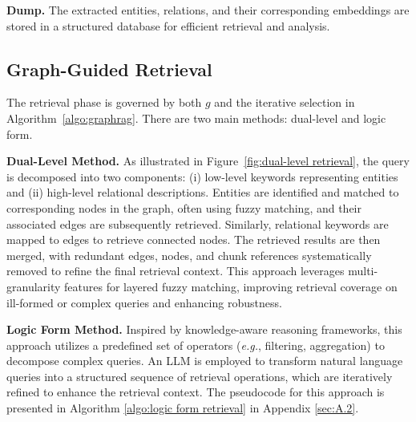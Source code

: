 \documentclass[11pt]{article}
\begin{document}
\noindent\textbf{Dump.} The extracted entities, relations, and their corresponding embeddings are stored in a structured database for efficient retrieval and analysis.






\subsection{Graph-Guided Retrieval}
The retrieval phase is governed by both \(g\) and the iterative selection in Algorithm~\ref{algo:graphrag}. There are two main methods: dual-level and logic form.

    \noindent\textbf{Dual-Level Method.} As illustrated in Figure~\ref{fig:dual-level retrieval}, the query is decomposed into two components: (i) low-level keywords representing entities and (ii) high-level relational descriptions. Entities are identified and matched to corresponding nodes in the graph, often using fuzzy matching, and their associated edges are subsequently retrieved. Similarly, relational keywords are mapped to edges to retrieve connected nodes. The retrieved results are then merged, with redundant edges, nodes, and chunk references systematically removed to refine the final retrieval context. This approach leverages multi-granularity features for layered fuzzy matching, improving retrieval coverage on ill-formed or complex queries and enhancing robustness.
    
    \noindent\textbf{Logic Form Method.} Inspired by knowledge-aware reasoning frameworks, this approach utilizes a predefined set of operators (\textit{e.g.}, filtering, aggregation) to decompose complex queries. An LLM is employed to transform natural language queries into a structured sequence of retrieval operations, which are iteratively refined to enhance the retrieval context. The pseudocode for this approach is presented in Algorithm \ref{algo:logic form retrieval} in Appendix \ref{sec:A.2}.
\end{document}
